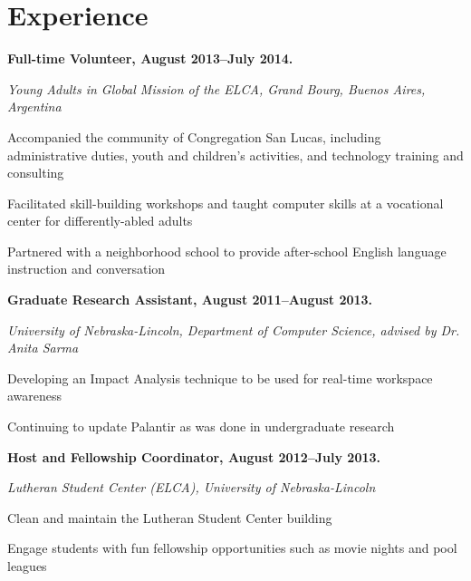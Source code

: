 \documentclass[10pt,letterpaper]{article}
\renewenvironment{itemize}{
  \begin{list}{}{
    \setlength{\leftmargin}{1.5em}
    \setlength{\itemsep}{0.25em}
    \setlength{\parskip}{0pt}
    \setlength{\parsep}{0.25em}
  }
}{
  \end{list}
}
\begin{document}
\section*{Experience}


\begin{itemize}
\item \textbf{Full-time Volunteer, August
2013--July 2014.}
\item \emph{Young Adults in Global Mission of the ELCA, Grand Bourg, Buenos Aires, Argentina}
	\begin{itemize}
    \item Accompanied the community of Congregation San Lucas, including
    administrative duties, youth and children's activities, and technology
    training and consulting
    \item Facilitated skill-building workshops and taught computer skills at
    a vocational center for differently-abled adults
    \item Partnered with a neighborhood school to provide after-school
    English language instruction and conversation
	\end{itemize}
\end{itemize}

\begin{itemize}
\item \textbf{Graduate Research Assistant, August 2011--August 2013.}
\item \emph{University of Nebraska-Lincoln, Department of Computer Science, advised by Dr. Anita Sarma}
	\begin{itemize}
	\item Developing an Impact Analysis technique to be used for real-time workspace awareness
	\item Continuing to update Palantir as was done in undergraduate research
	\end{itemize}
\end{itemize}

\begin{itemize}
\item \textbf{Host and Fellowship Coordinator, August 2012--July 2013.}
\item \emph{Lutheran Student Center (ELCA), University of Nebraska-Lincoln}
    \begin{itemize}
    \item Clean and maintain the Lutheran Student Center building
    \item Engage students with fun fellowship opportunities such as movie nights and pool leagues
    \end{itemize}
\end{itemize}
\end{document}
